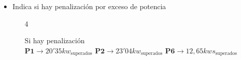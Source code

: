\documentclass[13pt]{article}
\begin{document}
\begin{flushleft}
\begin{itemize}
  \item Indica si hay penalización por exceso de potencia
    \begin{enumerate}
  \item[4]\begin{flushleft}
     Si hay penalización
     \\ 
     \(\mathbf{P1}\to 20'35kw_\mathrm{superados}\) \hfill \(\mathbf{P2}\to 23'04kw_\mathrm{superados}\) \hfill\(\mathbf{P6}\to 12,65kws_\mathrm{superados}\) \hfill
    \end{flushleft}
  \end{enumerate}

\end{itemize}

\end{flushleft}
\end{document}
